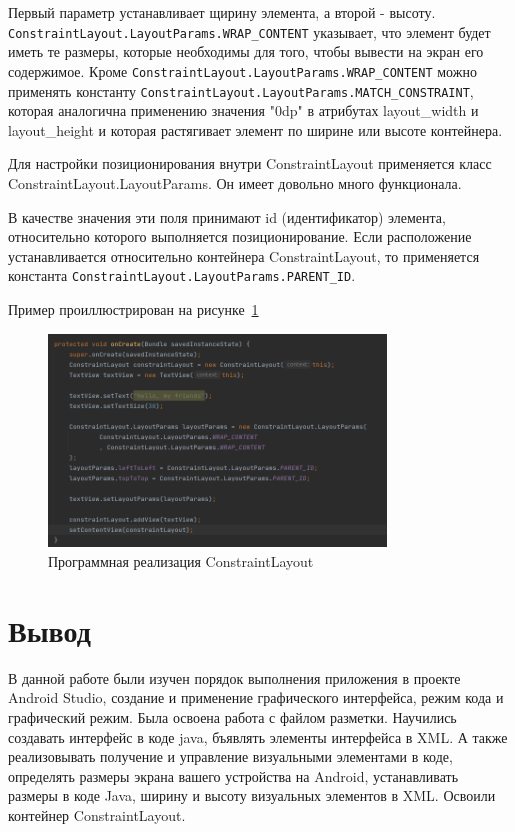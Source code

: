 Первый параметр устанавливает щирину элемента, а второй - высоту.
\texttt{ConstraintLayout.LayoutParams.WRAP\_CONTENT} указывает, что элемент
будет иметь те размеры, которые необходимы для того, чтобы вывести на
экран его содержимое. Кроме
\texttt{ConstraintLayout.LayoutParams.WRAP\_CONTENT} можно применять
константу \texttt{ConstraintLayout.LayoutParams.MATCH\_CONSTRAINT}, которая
аналогична применению значения "0dp" в атрибутах layout\_width и
layout\_height и которая растягивает элемент по ширине или высоте
контейнера.\par
Для настройки позиционирования внутри ConstraintLayout применяется класс
ConstraintLayout.LayoutParams. Он имеет довольно много функционала.\par
В качестве значения эти поля принимают id (идентификатор) элемента,
относительно которого выполняется позиционирование. Если расположение
устанавливается относительно контейнера ConstraintLayout, то применяется
константа \texttt{ConstraintLayout.LayoutParams.PARENT\_ID}.

Пример проиллюстрирован на рисунке~\ref{fig:java:constrainly}

\begin{figure}[h!tp]
	\centering
	\includegraphics[width=0.8\textwidth]{Screenshot from 2023-03-12 16-48-44.png}
	\caption{Программная реализация ConstraintLayout}
	\label{fig:java:constrainly}
\end{figure}

\clearpage

\section*{\LARGE{Вывод}}
В данной работе были изучен порядок выполнения приложения
в проекте Android Studio, создание и применение графического интерфейса,
режим кода и графический режим. Была освоена работа с файлом разметки.
Научились создавать интерфейс в коде java, бъявлять элементы интерфейса в XML.
А также реализовывать получение и управление визуальными элементами в коде,
определять размеры экрана вашего устройства на Android,
устанавливать размеры в коде Java, ширину и высоту визуальных элементов в XML.
Освоили контейнер ConstraintLayout.

